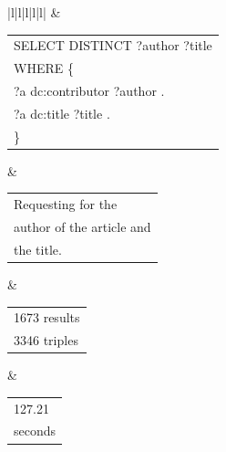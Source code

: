 \documentclass[12pt]{article}
\begin{document}
{\begin{tabular}{|l|l|l|l|l|}
			 & \begin{tabular}[c]{@{}l@{}}SELECT DISTINCT ?author ?title\\ WHERE \{\\       ?a dc:contributor ?author .\\       ?a dc:title ?title .\\ \}\end{tabular}                                                                                                                                                                                                                                                                                                                                  & \begin{tabular}[c]{@{}l@{}}Requesting for the \\ author of the article and\\ the title.\end{tabular}                                                                 & \begin{tabular}[c]{@{}l@{}}1673 results\\ 3346 triples\end{tabular} & \begin{tabular}[c]{@{}l@{}}127.21 \\ seconds\end{tabular} \\  

\end{tabular}}
\end{document}
